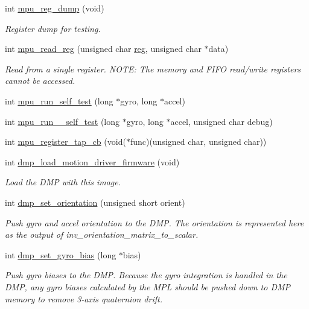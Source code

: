 \begin{DoxyCompactItemize}
int \hyperlink{group___d_r_i_v_e_r_s_ga0e1201ecfd8453f1d89e4299528baaf6}{mpu\+\_\+reg\+\_\+dump} (void)
\begin{DoxyCompactList}\small\item\em Register dump for testing. \end{DoxyCompactList}\item 
int \hyperlink{group___d_r_i_v_e_r_s_ga5c35a3363337014e11769a0ea7c0dfa9}{mpu\+\_\+read\+\_\+reg} (unsigned char \hyperlink{inv__mpu_8c_a5448c351fc95ff052b110eee80e5f75c}{reg}, unsigned char $\ast$data)
\begin{DoxyCompactList}\small\item\em Read from a single register. N\+O\+TE\+: The memory and F\+I\+FO read/write registers cannot be accessed. \end{DoxyCompactList}\item 
int \hyperlink{group___d_r_i_v_e_r_s_ga3773dc98eb1ba15da0091ae75abcf62f}{mpu\+\_\+run\+\_\+self\+\_\+test} (long $\ast$gyro, long $\ast$accel)
\item 
int \hyperlink{group___d_r_i_v_e_r_s_gac22890157bd3f7cc3752c0342f105b72}{mpu\+\_\+run\+\_\+\_\+self\+\_\+test} (long $\ast$gyro, long $\ast$accel, unsigned char debug)
\item 
int \hyperlink{group___d_r_i_v_e_r_s_ga0d528114a4e355a10ffd354a4c89a17f}{mpu\+\_\+register\+\_\+tap\+\_\+cb} (void($\ast$func)(unsigned char, unsigned char))
\item 
int \hyperlink{group___d_r_i_v_e_r_s_ga66626a842452f444e9af29cb0d2c6150}{dmp\+\_\+load\+\_\+motion\+\_\+driver\+\_\+firmware} (void)
\begin{DoxyCompactList}\small\item\em Load the D\+MP with this image. \end{DoxyCompactList}\item 
int \hyperlink{group___d_r_i_v_e_r_s_ga6cb5ff144ce6e1546f00809de8bb24a4}{dmp\+\_\+set\+\_\+orientation} (unsigned short orient)
\begin{DoxyCompactList}\small\item\em Push gyro and accel orientation to the D\+MP. The orientation is represented here as the output of {\itshape inv\+\_\+orientation\+\_\+matrix\+\_\+to\+\_\+scalar}. \end{DoxyCompactList}\item 
int \hyperlink{group___d_r_i_v_e_r_s_ga4766e37ef95cbf0044c8f9594ed811d1}{dmp\+\_\+set\+\_\+gyro\+\_\+bias} (long $\ast$bias)
\begin{DoxyCompactList}\small\item\em Push gyro biases to the D\+MP. Because the gyro integration is handled in the D\+MP, any gyro biases calculated by the M\+PL should be pushed down to D\+MP memory to remove 3-\/axis quaternion drift. ~\newline

\end{DoxyCompactList}
\end{DoxyCompactItemize}
